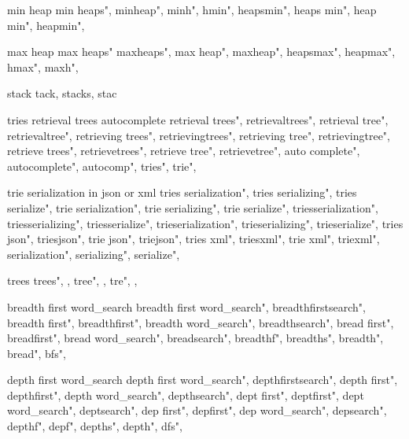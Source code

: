          min heap 
        min heaps",
        minheap", 
        minh", 
        hmin",
        heapsmin",
        heaps min",
        heap min",
        heapmin",
        
         max heap
        max heaps"
        maxheaps",
        max heap",
        maxheap", 
        heapsmax",
        heapmax", 
        hmax",
        maxh",
        
         stack
        tack, stacks, stac
        
         tries retrieval trees autocomplete 
        retrieval trees",  
        retrievaltrees",  
        retrieval tree",  
        retrievaltree",  
        retrieving trees",  
        retrievingtrees",  
        retrieving tree",  
        retrievingtree",  
        retrieve trees",  
        retrievetrees",  
        retrieve tree",  
        retrievetree",  
        auto complete",  
        autocomplete",  
        autocomp",  
        tries",  
        trie",  
        
         trie serialization in json or xml 
        tries serialization",  
        tries serializing",  
        tries serialize",  
        trie serialization",  
        trie serializing",  
        trie serialize",  
        triesserialization",  
        triesserializing",  
        triesserialize",  
        trieserialization",  
        trieserializing",  
        trieserialize",  
        tries json",  
        triesjson",  
        trie json",  
        triejson",  
        tries xml",  
        triesxml",  
        trie xml",  
        triexml",  
        serialization",  
        serializing",  
        serialize",  
        
         trees 
        trees", , 
        tree", , 
        tre", , 
        
         breadth first word_search 
        breadth first word_search",  
        breadthfirstsearch",  
        breadth first",  
        breadthfirst",  
        breadth word_search",  
        breadthsearch",  
        bread first",  
        breadfirst",  
        bread word_search",  
        breadsearch",  
        breadthf",  
        breadths",  
        breadth",  
        bread",  
        bfs",  
        
         depth first word_search 
        depth first word_search",  
        depthfirstsearch",  
        depth first",  
        depthfirst",  
        depth word_search",  
        depthsearch",  
        dept first",  
        deptfirst",  
        dept word_search",  
        deptsearch",  
        dep first",  
        depfirst",  
        dep word_search",  
        depsearch",  
        depthf",  
        depf",  
        depths",  
        depth",  
        dfs",  
        
